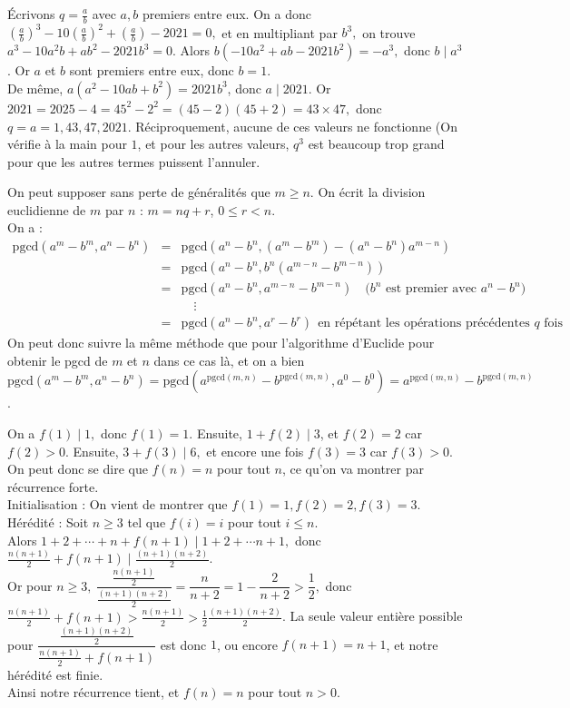 \begin{sol}
Écrivons $q=\frac ab$ avec $a,b$ premiers entre eux. On a donc $(\frac ab)^3-10(\frac ab)^2+(\frac ab)-2021=0,$ et en multipliant par $b^3,$ on trouve $a^3-10a^2b+ab^2-2021b^3=0.$ Alors $b(-10a^2+ab-2021b^2)=-a^3,$ donc $b\mid a^3$. Or $a$ et $b$ sont premiers entre eux, donc $b=1.$\\
De même, $a(a^2-10ab+b^2)=2021b^3$, donc $a\mid 2021.$ Or $2021=2025-4=45^2-2^2=(45-2)(45+2)=43\times 47,$ donc $q=a=1,43,47,2021.$ Réciproquement, aucune de ces valeurs ne fonctionne (On vérifie à la main pour $1$, et pour les autres valeurs, $q^3$ est beaucoup trop grand pour que les autres termes puissent l'annuler.
\end{sol}
\begin{sol}
On peut supposer sans perte de généralités que $m\ge n$. On écrit la division euclidienne de $m$ par $n$ : $m=nq+r$, $0\le r<n$. \\
On a :
\begin{eqnarray*}
\mathrm{pgcd}(a^m-b^m,a^n-b^n)
&=&\mathrm{pgcd}(a^n-b^n,(a^m-b^m)-(a^n-b^n)a^{m-n})\\
&=&\mathrm{pgcd}(a^n-b^n,b^n(a^{m-n}-b^{m-n}))\\
&=&\mathrm{pgcd}(a^n-b^n,a^{m-n}-b^{m-n})\quad\text{($b^n$ est premier avec $a^n-b^n$)}\\
&&\quad \vdots\\
&=&\mathrm{pgcd}(a^n -b^n,a^r -b^r) \:\:\text{en répétant les opérations précédentes $q$ fois}
\end{eqnarray*}
On peut donc suivre la même méthode que pour l'algorithme d'Euclide pour obtenir le pgcd de $m$ et $n$ dans ce cas là, et on a bien $$\mathrm{pgcd}(a^m-b^m,a^n-b^n)=\mathrm{pgcd}(a^{\mathrm{pgcd}(m,n)}-b^{\mathrm{pgcd}(m,n)},a^0-b^0)=a^{\mathrm{pgcd}(m,n)}-b^{\mathrm{pgcd}(m,n)}$$.
\end{sol}
\begin{sol}
On a $f(1)\mid 1,$ donc $f(1)=1.$ Ensuite, $1+f(2)\mid 3$, et $f(2)=2$ car $f(2)>0.$ Ensuite, $3+f(3)\mid 6,$ et encore une fois $f(3)=3$ car $f(3)>0.$ On peut donc se dire que $f(n)=n$ pour tout $n$, ce qu'on va montrer par récurrence forte.\\
Initialisation : On vient de montrer que $f(1)=1,f(2)=2,f(3)=3.$\\
Hérédité : Soit $n\geqslant 3$ tel que $f(i)=i$ pour tout $i\leqslant n$.\\ Alors $1+2+\cdots+n+f(n+1)\mid 1+2+\cdots n+1,$ donc $\frac{n(n+1)}2+f(n+1)\mid \frac{(n+1)(n+2)}2$. \\
Or pour $n\geqslant 3,\:\dfrac{\frac{n(n+1)}2}{\frac{(n+1)(n+2)}2}=\dfrac n{n+2}=1-\dfrac2{n+2}>\dfrac12,$ donc $\frac{n(n+1)}2+f(n+1)>\frac{n(n+1)}2>\frac12\frac{(n+1)(n+2)}2$. La seule valeur entière possible pour $\dfrac{\frac{(n+1)(n+2)}2}{\frac{n(n+1)}2+f(n+1)}$ est donc $1$, ou encore $f(n+1)=n+1$, et notre hérédité est finie.\\Ainsi notre récurrence tient, et $f(n)=n$ pour tout $n>0.$
\end{sol}